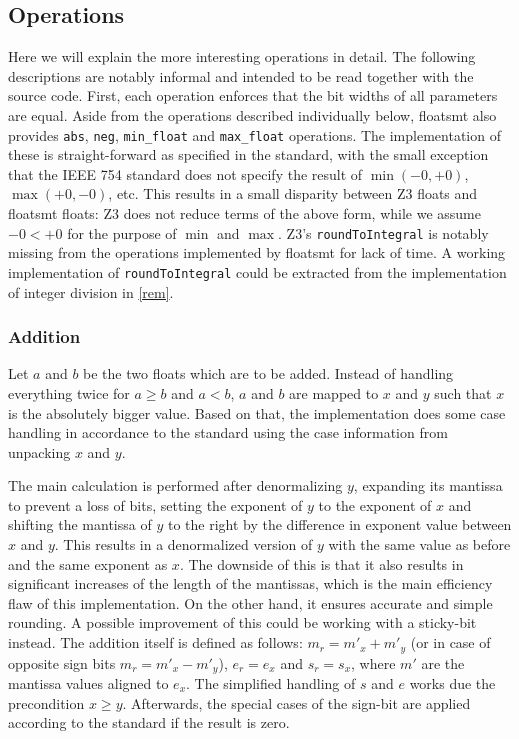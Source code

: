\documentclass[a4paper,UKenglish,cleveref, autoref, thm-restate]{lipics-v2019}
\begin{document}
\subsection{Operations}
Here we will explain the more interesting operations in detail. The following descriptions are notably informal and intended to be read together with the source code. First, each operation enforces that the bit widths of all parameters are equal. Aside from the operations described individually below, floatsmt also provides \verb|abs|, \verb|neg|, \verb|min_float| and \verb|max_float| operations. The implementation of these is straight-forward as specified in the standard, with the small exception that the IEEE 754 standard does not specify the result of $\min(-0, +0)$, $\max(+0, -0)$, etc. This results in a small disparity between Z3 floats and floatsmt floats: Z3 does not reduce terms of the above form, while we assume $-0 < +0$ for the purpose of $\min$ and $\max$. Z3's \verb|roundToIntegral| is notably missing from the operations implemented by floatsmt for lack of time. A working implementation of \verb|roundToIntegral| could be extracted from the implementation of integer division in \cref{rem}.

\subsubsection{Addition}
Let $a$ and $b$ be the two floats which are to be added. Instead of handling everything twice for $a\geq b$ and $a<b$, $a$ and $b$ are mapped to $x$ and $y$ such that $x$ is the absolutely bigger value. Based on that, the implementation does some case handling in accordance to the standard using the case information from unpacking $x$ and $y$.

The main calculation is performed after denormalizing $y$, expanding its mantissa to prevent a loss of bits, setting the exponent of $y$ to the exponent of $x$ and shifting the mantissa of $y$ to the right by the difference in exponent value between $x$ and $y$. This results in a denormalized version of $y$ with the same value as before and the same exponent as $x$. The downside of this is that it also results in significant increases of the length of the mantissas, which is the main efficiency flaw of this implementation. On the other hand, it ensures accurate and simple rounding. A possible improvement of this could be working with a sticky-bit instead. The addition itself is defined as follows: $m_r = m'_x + m'_y$ (or in case of opposite sign bits $m_r = m'_x - m'_y$), $e_r = e_x$ and $s_r = s_x$, where $m'$ are the mantissa values aligned to $e_x$. The simplified handling of $s$ and $e$ works due the 
precondition $x \geq y$. Afterwards, the special cases of the sign-bit are applied according to the standard if the result is zero.
\end{document}
